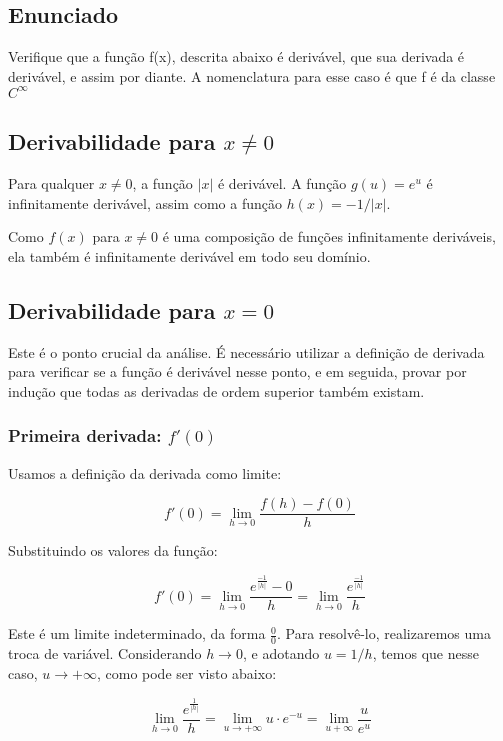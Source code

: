 \documentclass[../resumo.tex]{subfiles}
\begin{document}
	\subsection{Enunciado}

	Verifique que a função f(x), descrita abaixo é derivável, que sua derivada é derivável, e assim por
	diante. A nomenclatura para esse caso é que f é da classe $C^\infty$

	\subsection{Derivabilidade para $x \neq 0$}

	Para qualquer $x \neq 0$, a função $|x|$ é derivável. A função $g(u) = e^u$ é infinitamente derivável,
	assim como a função $h(x) = -1/|x|$.

	Como $f(x)$ para $x \neq 0$ é uma composição de funções infinitamente deriváveis, ela também é infinitamente
	derivável em todo seu domínio.

	\subsection{Derivabilidade para $x = 0$}

	Este é o ponto crucial da análise. É necessário utilizar a definição de derivada para verificar se
	a função é derivável nesse ponto, e em seguida, provar por indução que todas as derivadas de ordem superior
	também existam.

	\subsubsection{Primeira derivada: $f'(0)$}

	Usamos a definição da derivada como limite:

	\[f'(0) = \lim_{h\to0} \frac{f(h) - f(0)}{h}\]

	Substituindo os valores da função:

	\[f'(0) = \lim_{h\to0} \frac{e^{\frac{-1}{|h|}} - 0}{h} = \lim_{h\to0} \frac{e^{\frac{-1}{|h|}}}{h}\]

	Este é um limite indeterminado, da forma $\frac{0}{0}$. Para resolvê-lo, realizaremos uma troca de variável.
	Considerando $h\to0$, e adotando $u = 1/h$, temos que nesse caso, $u\to+\infty$, como pode ser visto abaixo:

	\[\lim_{h\to0} \frac{e^{\frac{1}{|h|}}}{h} = \lim_{u\to+\infty} u\cdot e^{-u} = \lim_{u+\infty}\frac{u}{e^u}\]
\end{document}

